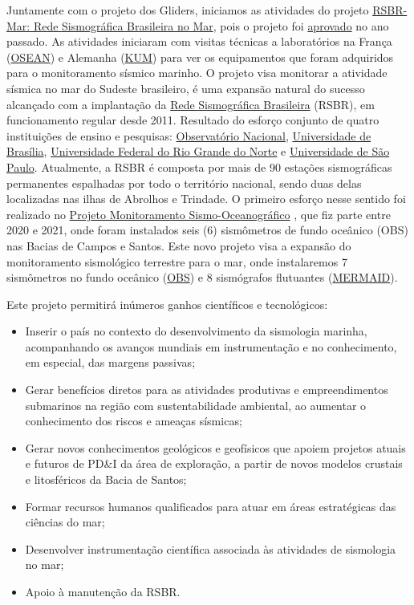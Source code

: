 \documentclass[10pt,a4paper,oneside]{book}
\begin{document}
Juntamente com o projeto dos Gliders, iniciamos as atividades do projeto \href{https://www.facc10.org.br/?page_id=11016\&voltar=10963\&projeto=RSBRMAR\&fonte=C&controle=C&migracao=2022-12-16}{RSBR-Mar: Rede Sismográfica Brasileira no Mar}, pois o projeto foi \href{http://www.finep.gov.br/images/contratos-Adm/2022/dou/Y_S_dias_extrato_contrato.pdf}{aprovado} no ano passado. As atividades iniciaram com visitas técnicas a laboratórios na França (\href{https://www.osean.fr/}{OSEAN}) e Alemanha (\href{https://www.kum-kiel.de/}{KUM}) para ver os equipamentos que foram adquiridos para o monitoramento sísmico marinho. O projeto visa monitorar a atividade sísmica no mar do Sudeste brasileiro, é uma expansão natural do sucesso alcançado com a implantação da \href{www.rsbr.on.br}{Rede Sismográfica Brasileira} (RSBR), em funcionamento regular desde 2011. Resultado do esforço conjunto de quatro instituições de ensino e pesquisas: \href{http://www.rsis.on.br/}{Observatório Nacional}, \href{http://obsis.unb.br/portalsis/}{Universidade de Brasília}, \href{https://labsis.ufrn.br/}{Universidade Federal do Rio Grande do Norte} e \href{https://moho.iag.usp.br/}{Universidade de São Paulo}. Atualmente, a RSBR é composta por mais de 90 estações sismográficas permanentes espalhadas por todo o território nacional, sendo duas delas localizadas nas ilhas de Abrolhos e Trindade. O primeiro esforço nesse sentido foi realizado no \href{https://sismo-oceano.ufsc.br/projeto-obs/}{Projeto Monitoramento Sismo-Oceanográfico} , que fiz parte entre 2020 e 2021, onde foram instalados seis (6) sismômetros de fundo oceânico (OBS) nas Bacias de Campos e Santos. Este novo projeto visa a expansão do monitoramento sismológico terrestre para o mar, onde instalaremos 7 sismômetros no fundo oceânico (\href{https://www.kum-kiel.de/products/nammu.html}{OBS}) e 8 sismógrafos flutuantes (\href{https://www.geoazur.fr/GLOBALSEIS/Mermaid.html}{MERMAID}). 

Este projeto permitirá inúmeros ganhos científicos e tecnológicos:
\begin{itemize}
	\item Inserir o país no contexto do desenvolvimento da sismologia marinha, acompanhando os avanços mundiais em instrumentação e no conhecimento, em especial, das margens passivas;
	\item Gerar benefícios diretos para as atividades produtivas e empreendimentos submarinos na região com sustentabilidade ambiental, ao aumentar o conhecimento dos riscos e ameaças sísmicas;
	\item Gerar novos conhecimentos geológicos e geofísicos que apoiem projetos atuais e futuros de PD\&I da área de exploração, a partir de novos modelos crustais e litosféricos da Bacia de Santos;
	\item Formar recursos humanos qualificados para atuar em áreas estratégicas das ciências do mar;
	\item Desenvolver instrumentação científica associada às atividades de sismologia no mar;
	\item Apoio à manutenção da RSBR.
\end{itemize}
\end{document}

